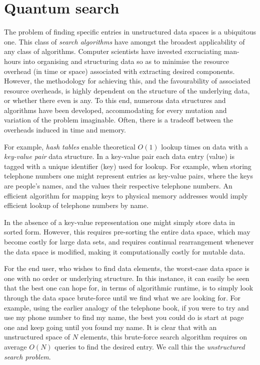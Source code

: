 \documentclass[aps,pra,singlecolumn,superscriptaddress]{revtex4-1}
\begin{document}
\maketitle

\section{Quantum search}

The problem of finding specific entries in unstructured data spaces is a ubiquitous one. This class of \textit{search algorithms} have amongst the broadest applicability of any class of algorithms. Computer scientists have invested excruciating man-hours into organising and structuring data so as to minimise the resource overhead (in time or space) associated with extracting desired components. However, the methodology for achieving this, and the favourability of associated resource overheads, is highly dependent on the structure of the underlying data, or whether there even is any. To this end, numerous data structures and algorithms have been developed, accommodating for every mutation and variation of the problem imaginable. Often, there is a tradeoff between the overheads induced in time and memory.

For example, \textit{hash tables} enable theoretical $O(1)$ lookup times on data with a \textit{key-value pair} data structure. In a key-value pair each data entry (value) is tagged with a unique identifier (key) used for lookup. For example, when storing telephone numbers one might represent entries as key-value pairs, where the keys are people's names, and the values their respective telephone numbers. An efficient algorithm for mapping keys to physical memory addresses would imply efficient lookup of telephone numbers by name.

In the absence of a key-value representation one might simply store data in sorted form. However, this requires pre-sorting the entire data space, which may become costly for large data sets, and requires continual rearrangement whenever the data space is modified, making it computationally costly for mutable data.

For the end user, who wishes to find data elements, the worst-case data space is one with no order or underlying structure. In this instance, it can easily be seen that the best one can hope for, in terms of algorithmic runtime, is to simply look through the data space brute-force until we find what we are looking for. For example, using the earlier analogy of the telephone book, if you were to try and use my phone number to find my name, the best you could do is start at page one and keep going until you found my name. It is clear that with an unstructured space of $N$ elements, this brute-force search algorithm requires on average $O(N)$ queries to find the desired entry. We call this the \textit{unstructured search problem}.
\end{document}
